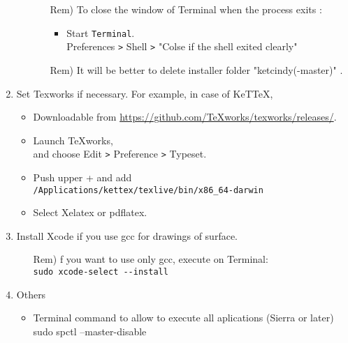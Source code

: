 \documentclass{article}
\begin{document}
\begin{enumerate}[\bf\large 1.]
\begin{enumerate}[(1)]
    \begin{itemize}
    \item[Rem)]To close the window of Terminal when the process exits :
      \begin{itemize}
      \item Start \verb|Terminal|.\\
      \hspace*{10mm}Preferences \verb|>| Shell \verb|>| "Colse if the shell exited clearly"
      \end{itemize}
    \item[Rem)]It will be better to delete installer folder "ketcindy(-master)" .
    \end{itemize} 
  \end{enumerate}
\item Set Texworks if necessary. For example, in case of KeTTeX,
  \begin{itemize}
  \item Downloadable from \url{https://github.com/TeXworks/texworks/releases/}.
  \item Launch TeXworks,\\
  \hspace*{10mm}and choose Edit \verb|>| Preference \verb|>| Typeset.
  \item Push upper + and add\\
  \hspace*{5mm}\verb|/Applications/kettex/texlive/bin/x86_64-darwin|
  \item Select Xelatex or pdflatex.
  \end{itemize}

\item Install Xcode if you use gcc for drawings of surface.
  \begin{itemize}
  \item[Rem)]f you want to use only gcc, execute on Terminal:\\
    \hspace*{10mm}\verb|sudo xcode-select --install|
  \end{itemize}

\item Others
 \begin{itemize}
  \item Terminal command to allow to execute all aplications (Sierra or later)\\
\hspace*{20mm}sudo spctl --master-disable
 \end{itemize}
\end{enumerate}
\end{document}
